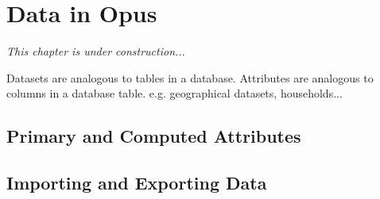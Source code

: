 \chapter{Data in Opus}

\emph{This chapter is under construction...}

Datasets are analogous to tables in a database. Attributes
are analogous to columns in a database table. e.g. geographical
datasets, households...

\section{Primary and Computed Attributes}

\section{Importing and Exporting Data}
